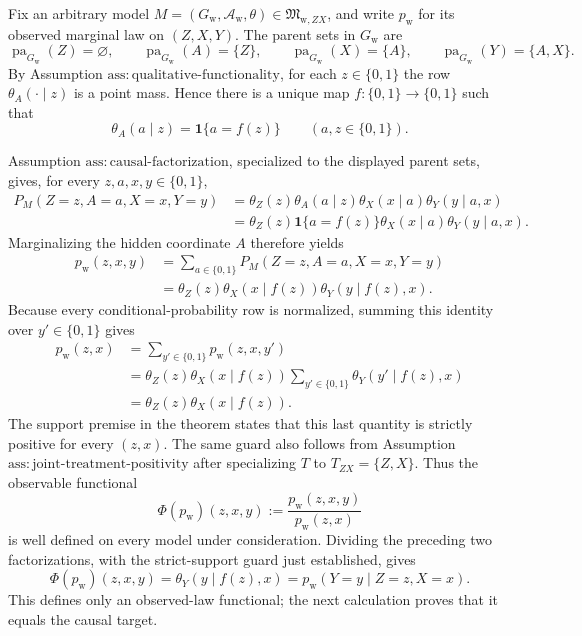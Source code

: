 Fix an arbitrary model \(M=(G_{\mathrm w},\mathcal A_{\mathrm w},\theta)\in\mathfrak M_{\mathrm w,ZX}\), and write \(p_{\mathrm w}\) for its observed marginal law on \((Z,X,Y)\).  The parent sets in \(G_{\mathrm w}\) are
\[
\operatorname{pa}_{G_{\mathrm w}}(Z)=\varnothing,
\qquad
\operatorname{pa}_{G_{\mathrm w}}(A)=\{Z\},
\qquad
\operatorname{pa}_{G_{\mathrm w}}(X)=\{A\},
\qquad
\operatorname{pa}_{G_{\mathrm w}}(Y)=\{A,X\}.
\]
By Assumption \(\mathrm{ass:qualitative\text{-}functionality}\), for each \(z\in\{0,1\}\) the row \(\theta_A(\cdot\mid z)\) is a point mass.  Hence there is a unique map \(f:\{0,1\}\to\{0,1\}\) such that
\[
\theta_A(a\mid z)=\mathbf 1\{a=f(z)\}
\qquad(a,z\in\{0,1\}).
\]

Assumption \(\mathrm{ass:causal\text{-}factorization}\), specialized to the displayed parent sets, gives, for every \(z,a,x,y\in\{0,1\}\),
\[
\begin{aligned}
P_M(Z=z,A=a,X=x,Y=y)
&=\theta_Z(z)\theta_A(a\mid z)\theta_X(x\mid a)\theta_Y(y\mid a,x)\\
&=\theta_Z(z)\mathbf 1\{a=f(z)\}\theta_X(x\mid a)\theta_Y(y\mid a,x).
\end{aligned}
\]
Marginalizing the hidden coordinate \(A\) therefore yields
\[
\begin{aligned}
p_{\mathrm w}(z,x,y)
&=\sum_{a\in\{0,1\}}P_M(Z=z,A=a,X=x,Y=y)\\
&=\theta_Z(z)\theta_X(x\mid f(z))\theta_Y(y\mid f(z),x).
\end{aligned}
\]
Because every conditional-probability row is normalized, summing this identity over \(y'\in\{0,1\}\) gives
\[
\begin{aligned}
p_{\mathrm w}(z,x)
&=\sum_{y'\in\{0,1\}}p_{\mathrm w}(z,x,y')\\
&=\theta_Z(z)\theta_X(x\mid f(z))
  \sum_{y'\in\{0,1\}}\theta_Y(y'\mid f(z),x)\\
&=\theta_Z(z)\theta_X(x\mid f(z)).
\end{aligned}
\]
The support premise in the theorem states that this last quantity is strictly positive for every \((z,x)\).  The same guard also follows from Assumption \(\mathrm{ass:joint\text{-}treatment\text{-}positivity}\) after specializing \(T\) to \(T_{ZX}=\{Z,X\}\).  Thus the observable functional
\[
\Phi(p_{\mathrm w})(z,x,y)
:=
\frac{p_{\mathrm w}(z,x,y)}{p_{\mathrm w}(z,x)}
\]
is well defined on every model under consideration.  Dividing the preceding two factorizations, with the strict-support guard just established, gives
\[
\Phi(p_{\mathrm w})(z,x,y)
=\theta_Y(y\mid f(z),x)
=p_{\mathrm w}(Y=y\mid Z=z,X=x).
\]
This defines only an observed-law functional; the next calculation proves that it equals the causal target.

